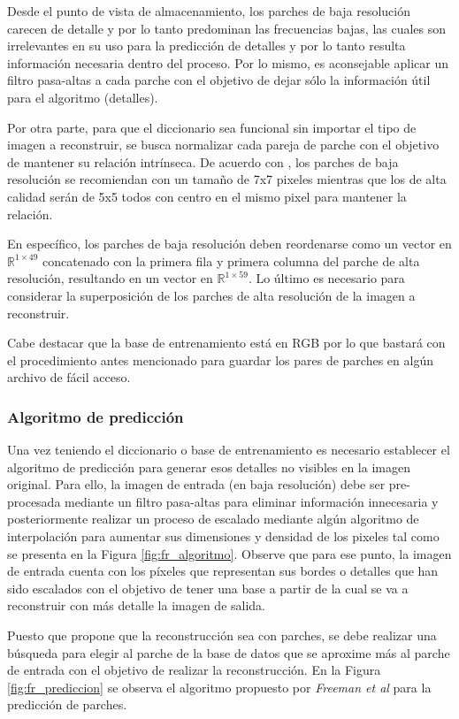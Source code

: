 Desde el punto de vista de almacenamiento, los parches de baja resolución carecen 
de detalle y por lo tanto predominan las frecuencias bajas, las cuales son 
irrelevantes en su uso para la predicción de detalles y por lo tanto resulta
información necesaria dentro del proceso. Por lo mismo, es aconsejable aplicar un filtro pasa-altas a cada parche 
con el objetivo de dejar sólo la información útil para el algoritmo (detalles).

Por otra parte, para que el diccionario sea funcional sin importar el 
tipo de imagen a reconstruir, se busca normalizar cada pareja de parche con el 
objetivo de mantener su relación intrínseca. De acuerdo con \cite{freeman}, 
los parches de baja resolución se recomiendan con un tamaño de 7x7 pixeles
mientras que los de alta calidad serán de 5x5 todos con centro en el mismo pixel
para mantener la relación.

En específico, los parches de baja resolución deben reordenarse como un vector 
en $\mathbb{R}^{1\times49}$ concatenado con la primera fila y primera columna
del parche de alta resolución, resultando en un vector en $\mathbb{R}^{1\times59}$.
Lo último es necesario para considerar la superposición
de los parches de alta resolución de la imagen a reconstruir. 

Cabe destacar que la base de entrenamiento está en 
RGB por lo que bastará con el procedimiento antes mencionado para guardar
los pares de parches en algún archivo de fácil acceso. 

\subsubsection{Algoritmo de predicción}
\noindent
Una vez teniendo el diccionario o base de entrenamiento es necesario establecer el algoritmo de 
predicción para generar esos detalles no visibles en la imagen original.
Para ello, la imagen de entrada (en baja resolución) debe ser pre-procesada
mediante un filtro pasa-altas para eliminar información innecesaria y posteriormente realizar
un proceso de escalado mediante algún algoritmo de interpolación para
aumentar sus dimensiones y densidad de los pixeles tal como se presenta
en la Figura \ref{fig:fr_algoritmo}. Observe que para ese punto, la imagen de entrada
cuenta con los píxeles que representan sus bordes o detalles que han sido
escalados con el objetivo de tener una base a partir de la cual se va a reconstruir
con más detalle la imagen de salida.  

Puesto que \cite{freeman} propone que la reconstrucción sea con parches, se debe 
realizar una búsqueda para elegir al parche de la base de datos que se aproxime 
más al parche de entrada con el objetivo de realizar la reconstrucción. En la
Figura \ref{fig:fr_prediccion} se observa el algoritmo propuesto por
\emph{Freeman et al} para la predicción de parches.

